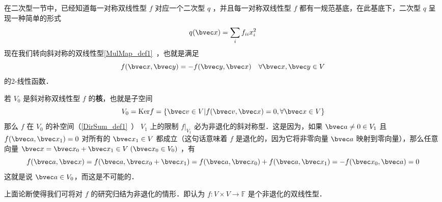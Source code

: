 
在二次型一节中，已经知道每一对称双线性型 $f$ 对应一个二次型 $q$ ，并且每一对称双线性型 $f$ 都有一规范基底，在此基底下，二次型 $q$ 呈现一种简单的形式
\begin{equation}
q(\bvec x)=\sum_{i}f_{ii}x_i^2
\end{equation}
现在我们转向斜对称的双线性型\autoref{MulMap_def1}~，也就是满足 
\begin{equation}
f(\bvec x,\bvec y)=-f(\bvec y,\bvec x)\quad \forall \bvec x,\bvec y\in V
\end{equation}
的2-线性函数．

若 $V_0$ 是斜对称双线性型 $f$ 的\textbf{核}，也就是子空间
\begin{equation}
V_0=\mathrm{Ker} f=\{\bvec v\in V|f(\bvec v,\bvec x)=0,\forall\bvec x\in V\}
\end{equation}
那么 $f$ 在 $V_0$ 的补空间（\autoref{DirSum_def1}~） $V_1$ 上的限制 $f|_{V_1}$ 必为非退化的斜对称型．这是因为，如果 $\bvec a\neq0\in V_1$ 且 $f(\bvec a,\bvec x_1)=0$ 对所有的 $\bvec x_1\in V$ 都成立（这句话意味着 $f$ 是退化的，因为它将非零向量 $\bvec a$ 映射到零向量），那么任意向量 $\bvec x=\bvec x_0+\bvec x_1\in V \;(\bvec x_0\in V_0)$ ，有
\begin{equation}
f(\bvec a,\bvec x)=f(\bvec a,\bvec x_0+\bvec x_1)=f(\bvec a,\bvec x_0)+f(\bvec a,\bvec x_1)=-f(\bvec x_0,\bvec a)=0
\end{equation}
 这就是说 $\bvec a\in V_0$，而这是不可能的．

 上面论断使得我们可将对 $f$ 的研究归结为非退化的情形．即认为 $f:V\times V\rightarrow\mathbb{F}$ 是个非退化的双线性型．